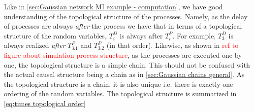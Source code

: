 \documentclass[../Thesis.tex]{subfiles}
\begin{document}
Like in \autoref{sec:Gaussian network MI example - computation}, we have good understanding of the topological structure of the processes. Namely, as the delay of processes are always \textit{after} the process we have that in terms of a topological structure of the random variables, $T^D_i$ is always after $T^P_i$. For example, $T^D_3$ is always realized \textit{after} $T^P_{3.1}$ and $T^P_{3.2}$ (in that order). Likewise, as shown in \textcolor{red}{ref to figure about simulation process structure}, as the processes are executed one by one, the topological structure is a simple chain. This should not be confused with the actual causal structure being a chain as in \autoref{sec:Gaussian chains general}. As the topological structure is a chain, it is also unique i.e. there is exactly one ordering of the random variables. The topological structure is summarized in \autoref{eq:times topological order}
\newpage
\end{document}
